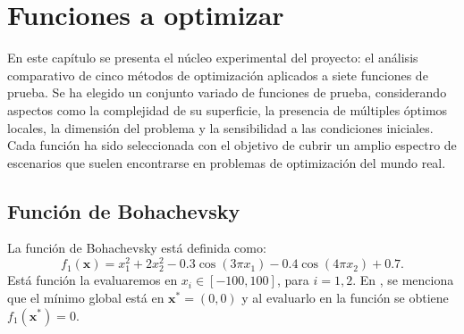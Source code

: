 \chapter{Funciones a optimizar}

En este capítulo se presenta el núcleo experimental del proyecto: el análisis comparativo de cinco métodos de optimización aplicados a siete funciones de prueba. Se ha elegido un conjunto variado de funciones de prueba, considerando aspectos como la complejidad de su superficie, la presencia de múltiples óptimos locales, la dimensión del problema y la sensibilidad a las condiciones iniciales. Cada función ha sido seleccionada con el objetivo de cubrir un amplio espectro de escenarios que suelen encontrarse en problemas de optimización del mundo real.

\section{Función de Bohachevsky} %

La función de Bohachevsky está definida como:
$$f_1(\mathbf{x}) = x_1^2 + 2x_2^2 - 0.3 \cos(3\pi x_1) - 0.4\cos(4\pi x_2) + 0.7.$$
Está función la evaluaremos en $x_i \in [-100, 100]$, para $i = 1, 2$. En \citep{sfuoptimization}, se menciona que el mínimo global está en $\mathbf{x}^* = (0, 0)$ y al evaluarlo en la función se obtiene $f_1\left(\mathbf{x}^*\right) = 0$.
\begin{figure}[H]
    \centering
    \caption{}
\end{figure}

